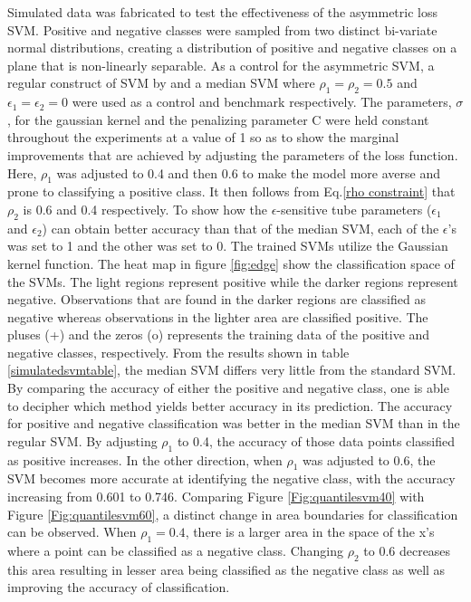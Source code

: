 \documentclass[twoside,11pt]{article}
\begin{document}
Simulated data was fabricated to test the effectiveness of the asymmetric loss SVM. Positive and negative classes were sampled from two distinct bi-variate normal distributions, creating a distribution of positive and negative classes on a plane that is non-linearly separable. As a control for the asymmetric SVM, a regular construct of SVM by \citet{Vapnik98} and a median SVM where $\rho_1=\rho_2=0.5$ and $\epsilon_1=\epsilon_2=0$ were used as a control and benchmark respectively. The parameters, $\sigma$, for the gaussian kernel and the penalizing parameter C were held constant throughout the experiments at a value of 1 so as to show the marginal improvements that are achieved by adjusting the parameters of the loss function. Here, $\rho_1$ was adjusted to 0.4 and then 0.6 to make the model more averse and prone to classifying a positive class. It then follows from Eq.\ref{rho constraint} that $\rho_2$ is 0.6 and 0.4 respectively. To show how the $\epsilon$-sensitive tube parameters ($\epsilon_1$ and $\epsilon_2$) can obtain better accuracy than that of the median SVM, each of the $\epsilon$'s was set to 1 and the other was set to 0. The trained SVMs utilize the Gaussian kernel function. The heat map in figure \ref{fig:edge} show the classification space of the SVMs. The light regions represent positive while the darker regions represent negative. Observations that are found in the darker regions are classified as negative whereas observations in the lighter area are classified positive. The pluses (+) and the zeros (o) represents the training data of the positive and negative classes, respectively. From the results shown in table \ref{simulatedsvmtable}, the median SVM differs very little from the standard SVM. By comparing the accuracy of either the positive and negative class, one is able to decipher which method yields better accuracy in its prediction. The accuracy for positive and negative classification was better in the median SVM than in the regular SVM. By adjusting $\rho_1$ to 0.4, the accuracy of those data points classified as positive increases. In the other direction, when $\rho_1$ was adjusted to 0.6, the SVM becomes more accurate at identifying the negative class, with the accuracy increasing from 0.601 to 0.746. Comparing Figure \ref{Fig:quantilesvm40} with Figure \ref{Fig:quantilesvm60}, a distinct change in area boundaries for classification can be observed. When $\rho_1=0.4$, there is a larger area in the space of the x's where a point can be classified as a negative class. Changing $\rho_2$ to 0.6 decreases this area resulting in lesser area being classified as the negative class as well as improving the accuracy of classification.
\end{document}
